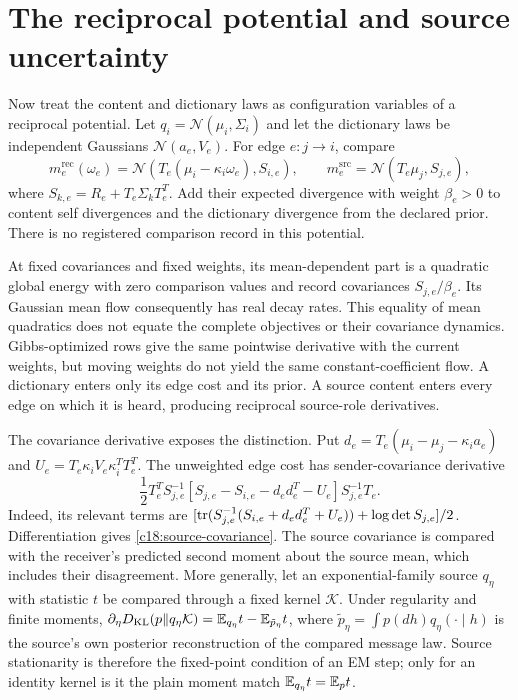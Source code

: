 \section{The reciprocal potential and source uncertainty}

Now treat the content and dictionary laws as configuration variables of a reciprocal potential. Let $q_i=\mathcal N(\mu_i,\Sigma_i)$ and let the dictionary laws be independent Gaussians $\mathcal N(a_e,V_e)$. For edge $e:j\to i$, compare
\begin{equation}
 m_e^{\mathrm{rec}}(\omega_e)
 =\mathcal N(T_e(\mu_i-\kappa_i\omega_e),S_{i,e}),
 \qquad m_e^{\mathrm{src}}=\mathcal N(T_e\mu_j,S_{j,e}),
 \label{c18:message-laws}
\end{equation}
where $S_{k,e}=R_e+T_e\Sigma_kT_e^T$. Add their expected divergence with weight $\beta_e>0$ to content self divergences and the dictionary divergence from the declared prior. There is no registered comparison record in this potential.

At fixed covariances and fixed weights, its mean-dependent part is a quadratic global energy with zero comparison values and record covariances $S_{j,e}/\beta_e$. Its Gaussian mean flow consequently has real decay rates. This equality of mean quadratics does not equate the complete objectives or their covariance dynamics. Gibbs-optimized rows give the same pointwise derivative with the current weights, but moving weights do not yield the same constant-coefficient flow. A dictionary enters only its edge cost and its prior. A source content enters every edge on which it is heard, producing reciprocal source-role derivatives.

The covariance derivative exposes the distinction. Put $d_e=T_e(\mu_i-\mu_j-\kappa_i a_e)$ and $U_e=T_e\kappa_iV_e\kappa_i^TT_e^T$. The unweighted edge cost has sender-covariance derivative
\begin{equation}
 \frac12T_e^TS_{j,e}^{-1}
       [S_{j,e}-S_{i,e}-d_ed_e^T-U_e]
       S_{j,e}^{-1}T_e.
 \label{c18:source-covariance}
\end{equation}
Indeed, its relevant terms are $[\operatorname{tr}(S_{j,e}^{-1}(S_{i,e}+d_ed_e^T+U_e))+\log\det S_{j,e}]/2$. Differentiation gives \cref{c18:source-covariance}. The source covariance is compared with the receiver's predicted second moment about the source mean, which includes their disagreement. More generally, let an exponential-family source $q_\eta$ with statistic $t$ be compared through a fixed kernel $\mathcal K$. Under regularity and finite moments, $\partial_\eta D_{\mathrm{KL}}(p\Vert q_\eta\mathcal K)=\mathbb E_{q_\eta}t-\mathbb E_{\tilde p_\eta}t$, where $\tilde p_\eta=\int p(dh)q_\eta(\cdot\mid h)$ is the source's own posterior reconstruction of the compared message law. Source stationarity is therefore the fixed-point condition of an EM step; only for an identity kernel is it the plain moment match $\mathbb E_{q_\eta}t=\mathbb E_pt$.

